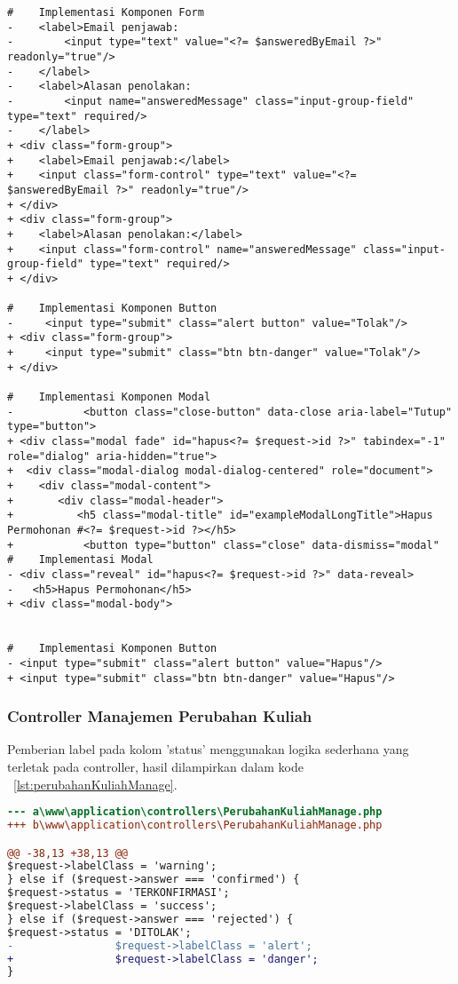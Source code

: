 \begin{lstlisting}
#    Implementasi Komponen Form
-    <label>Email penjawab:
-        <input type="text" value="<?= $answeredByEmail ?>" readonly="true"/>
-    </label>
-    <label>Alasan penolakan:
-        <input name="answeredMessage" class="input-group-field" type="text" required/>
-    </label>
+ <div class="form-group">
+    <label>Email penjawab:</label>
+    <input class="form-control" type="text" value="<?= $answeredByEmail ?>" readonly="true"/>
+ </div>
+ <div class="form-group">
+    <label>Alasan penolakan:</label>
+    <input class="form-control" name="answeredMessage" class="input-group-field" type="text" required/>
+ </div>

#    Implementasi Komponen Button                                          
-     <input type="submit" class="alert button" value="Tolak"/>
+ <div class="form-group">
+     <input type="submit" class="btn btn-danger" value="Tolak"/>
+ </div>

#    Implementasi Komponen Modal
-    	    <button class="close-button" data-close aria-label="Tutup" type="button">
+ <div class="modal fade" id="hapus<?= $request->id ?>" tabindex="-1" role="dialog" aria-hidden="true">
+  <div class="modal-dialog modal-dialog-centered" role="document">
+    <div class="modal-content">
+       <div class="modal-header">
+          <h5 class="modal-title" id="exampleModalLongTitle">Hapus Permohonan #<?= $request->id ?></h5>
+           <button type="button" class="close" data-dismiss="modal" 
#    Implementasi Modal
- <div class="reveal" id="hapus<?= $request->id ?>" data-reveal>
-	<h5>Hapus Permohonan</h5>
+ <div class="modal-body">


#    Implementasi Komponen Button
- <input type="submit" class="alert button" value="Hapus"/>
+ <input type="submit" class="btn btn-danger" value="Hapus"/>
\end{lstlisting}

\subsubsection{Controller Manajemen Perubahan Kuliah}
Pemberian label pada kolom 'status' menggunakan logika sederhana yang terletak pada controller, hasil dilampirkan dalam kode ~\ref{lst:perubahanKuliahManage}.
\begin{lstlisting}[language=diff, caption=Controller PerubahanKuliahManage,  basicstyle=\ttfamily, frame=single,
columns=fullflexible, keepspaces=true, breaklines=true, label={lst:perubahanKuliahManage}]
--- a\www\application\controllers\PerubahanKuliahManage.php	
+++ b\www\application\controllers\PerubahanKuliahManage.php	

@@ -38,13 +38,13 @@
$request->labelClass = 'warning';
} else if ($request->answer === 'confirmed') {
$request->status = 'TERKONFIRMASI';
$request->labelClass = 'success';
} else if ($request->answer === 'rejected') {
$request->status = 'DITOLAK';
-                $request->labelClass = 'alert';
+                $request->labelClass = 'danger';
}
\end{lstlisting}  

